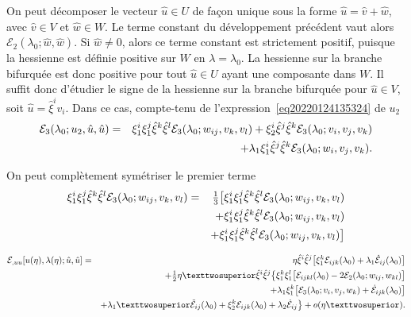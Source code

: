 \documentclass[12pt, final]{amsart}
\begin{document}
On peut décomposer le vecteur \(\hat{u}\in U\) de façon unique sous la forme
\(\hat{u}=\hat{v}+\hat{w}\), avec \(\hat{v}\in V\) et \(\hat{w}\in W\). Le terme
constant du développement précédent vaut alors \(\mathcal E_2(\lambda _0; \hat{w}, \hat{w})\). Si
\(\hat{w}\neq0\), alors ce terme constant est strictement positif, puisque la
hessienne est définie positive sur \(W\) en \(\lambda =\lambda _0\). La hessienne sur la
branche bifurquée est donc positive pour tout \(\hat{u}\in U\) ayant une
composante dans \(W\). Il suffit donc d'étudier le signe de la hessienne sur la
branche bifurquée pour \(\hat{u}\in V\), soit \(\hat{u}=\hat{\xi }^iv_i\). Dans ce
cas, compte-tenu de l'expression~\eqref{eq20220124135324} de \(u_2\)
\begin{eqnarray}
  \notag
  \mathcal E_3(\lambda _0; u_2, \hat{u}, \hat{u})
  &=&\xi _1^i\xi _1^j\hat{\xi }^k\hat{\xi }^l\mathcal E_3(\lambda _0; w_{ij}, v_k, v_l)
      +\xi _2^i\hat{\xi }^j\hat{\xi }^k\mathcal E_3(\lambda _0; v_i, v_j, v_k)\\
  &&+\lambda _1\xi _1^i\hat{\xi }^j\hat{\xi }^k\mathcal E_3(\lambda _0; w_i, v_j, v_k).
\end{eqnarray}

On peut complètement symétriser le premier terme
\begin{eqnarray}
  \notag
  \xi _1^i\xi _1^j\hat{\xi }^k\hat{\xi }^l\mathcal E_3(\lambda _0; w_{ij}, v_k, v_l)
  &=&\tfrac13\bigl[\xi _1^i\xi _1^j\hat{\xi }^k\hat{\xi }^l\mathcal E_3(\lambda _0; w_{ij}, v_k, v_l)\\
  \notag
  &&+\xi _1^i\xi _1^j\hat{\xi }^k\hat{\xi }^l\mathcal E_3(\lambda _0; w_{ij}, v_k, v_l)\\
  &&+\xi _1^i\xi _1^j\hat{\xi }^k\hat{\xi }^l\mathcal E_3(\lambda _0; w_{ij}, v_k, v_l)\bigr]
\end{eqnarray}

\begin{eqnarray}
  \notag
  \mathcal E_{,uu}[u(\eta ), \lambda (\eta ); \hat{u}, \hat{u}]
  &=&\eta \hat{\xi }^i\hat{\xi }^j\bigl[\xi _1^k\mathcal E_{ijk}(\lambda _0)+\lambda _1\dot{\mathcal E}_{ij}(\lambda _0)\bigr]\\
  \notag
  &&+\tfrac12\eta ²\hat{\xi }^i\hat{\xi }^j\bigl\{\xi _1^k\xi _1^l\bigl[\mathcal E_{ijkl}(\lambda _0)
     -2\mathcal E_2(\lambda _0; w_{ij}, w_{kl})\bigr]\\
  \notag
  &&+\lambda _1\xi _1^k\bigl[\mathcal E_3(\lambda _0; v_i, v_j, w_k)+\dot{\mathcal E}_{ijk}(\lambda _0)\bigr]\\
  \label{eq20220203144500}
  &&+\lambda _1²\ddot{\mathcal E}_{ij}(\lambda _0)+\xi _2^k\mathcal E_{ijk}(\lambda _0)+\lambda _2\dot{\mathcal E}_{ij}\bigr\}+o(\eta ²).
\end{eqnarray}
\end{document}
